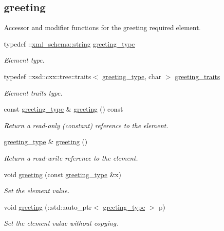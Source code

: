 \subsection*{greeting}
\label{_amgrp699e0311097c48b46019dcfc07c772a1}%
Accessor and modifier functions for the greeting required element. \begin{DoxyCompactItemize}
\item 
typedef \+::\hyperlink{namespacexml__schema_aefbaf353f9a0043af46d23d9040ef268}{xml\+\_\+schema\+::string} \hyperlink{classPolyData__t_ae1f86bd7b6a37a0d0851de8a44627177}{greeting\+\_\+type}
\begin{DoxyCompactList}\small\item\em Element type. \end{DoxyCompactList}\item 
typedef \+::xsd\+::cxx\+::tree\+::traits$<$ \hyperlink{classPolyData__t_ae1f86bd7b6a37a0d0851de8a44627177}{greeting\+\_\+type}, char $>$ \hyperlink{classPolyData__t_a0825d12eafceffcedbb147730b8bf8a6}{greeting\+\_\+traits}
\begin{DoxyCompactList}\small\item\em Element traits type. \end{DoxyCompactList}\item 
const \hyperlink{classPolyData__t_ae1f86bd7b6a37a0d0851de8a44627177}{greeting\+\_\+type} \& \hyperlink{classPolyData__t_acce3e6cf99db0b383320a0ccfd62789f}{greeting} () const 
\begin{DoxyCompactList}\small\item\em Return a read-\/only (constant) reference to the element. \end{DoxyCompactList}\item 
\hyperlink{classPolyData__t_ae1f86bd7b6a37a0d0851de8a44627177}{greeting\+\_\+type} \& \hyperlink{classPolyData__t_a3879d9f3b0b8ae707f1c2465bbbcf507}{greeting} ()
\begin{DoxyCompactList}\small\item\em Return a read-\/write reference to the element. \end{DoxyCompactList}\item 
void \hyperlink{classPolyData__t_a23d6e1490860af1f76f135efb37510e1}{greeting} (const \hyperlink{classPolyData__t_ae1f86bd7b6a37a0d0851de8a44627177}{greeting\+\_\+type} \&x)
\begin{DoxyCompactList}\small\item\em Set the element value. \end{DoxyCompactList}\item 
void \hyperlink{classPolyData__t_a27c66fbcb156a64615e29b1082facd00}{greeting} (\+::std\+::auto\+\_\+ptr$<$ \hyperlink{classPolyData__t_ae1f86bd7b6a37a0d0851de8a44627177}{greeting\+\_\+type} $>$ p)
\begin{DoxyCompactList}\small\item\em Set the element value without copying. \end{DoxyCompactList}\end{DoxyCompactItemize}
